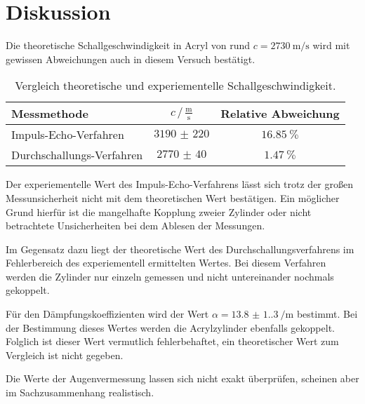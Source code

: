 \section{Diskussion}
\label{sec:Diskussion}
Die theoretische Schallgeschwindigkeit in Acryl von rund $c=\qty{2730}{\metre\per\second}$ \cite{c_Acryl} wird mit gewissen Abweichungen
auch in diesem Versuch bestätigt.
\begin{table}[H]
    \centering
    \caption{Vergleich theoretische und experiementelle Schallgeschwindigkeit.}
    \begin{tabular}{l S[table-format=3.0] S[table-format=2.1]}
        \toprule
         {Messmethode} & {$c\,/\,\frac{\unit{\metre}}{\unit{\second}}$} & {Relative Abweichung} \\
        \midrule
           {Impuls-Echo-Verfahren}	&  {$\num{3190(220)}$} & {$\qty{16,85}{\percent}$}\\
           {Durchschallungs-Verfahren}	&  {$\num{2770(40)}$} & {$\qty{1,47}{\percent}$}\\
        \bottomrule 
    \end{tabular}
  \end{table}
Der experiementelle Wert des Impuls-Echo-Verfahrens lässt sich trotz der großen Messunsicherheit nicht mit dem theoretischen Wert bestätigen. 
Ein möglicher Grund hierfür ist die mangelhafte Kopplung zweier Zylinder oder nicht betrachtete Unsicherheiten bei dem Ablesen der Messungen.

Im Gegensatz dazu liegt der theoretische Wert  des Durchschallungsverfahrens im Fehlerbereich des experiementell ermittelten Wertes. Bei diesem Verfahren
werden die Zylinder nur einzeln gemessen und nicht untereinander nochmals gekoppelt.

Für den Dämpfungskoeffizienten wird der Wert $\alpha = \qty{13.8(1.3)}{\per\metre}$ bestimmt. Bei der Bestimmung dieses Wertes werden die
Acrylzylinder ebenfalls gekoppelt. Folglich ist dieser Wert vermutlich fehlerbehaftet, ein theoretischer Wert zum Vergleich ist nicht gegeben.

Die Werte der Augenvermessung lassen sich nicht exakt überprüfen, scheinen aber im Sachzusammenhang realistisch.
